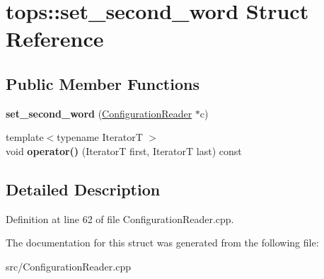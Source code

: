\hypertarget{structtops_1_1set__second__word}{}\section{tops\+:\+:set\+\_\+second\+\_\+word Struct Reference}
\label{structtops_1_1set__second__word}
\subsection*{Public Member Functions}
\begin{DoxyCompactItemize}
\item 
\mbox{\label{structtops_1_1set__second__word_ace000004d2aa9f69499a3259d31a959a}} 
{\bfseries set\+\_\+second\+\_\+word} (\hyperlink{classtops_1_1ConfigurationReader}{Configuration\+Reader} $\ast$c)
\item 
\mbox{\label{structtops_1_1set__second__word_a3a4e6a884e2610a7cb980a419c87ce92}} 
{\footnotesize template$<$typename IteratorT $>$ }\\void {\bfseries operator()} (IteratorT first, IteratorT last) const
\end{DoxyCompactItemize}


\subsection{Detailed Description}


Definition at line 62 of file Configuration\+Reader.\+cpp.



The documentation for this struct was generated from the following file\+:\begin{DoxyCompactItemize}
\item 
src/Configuration\+Reader.\+cpp\end{DoxyCompactItemize}
